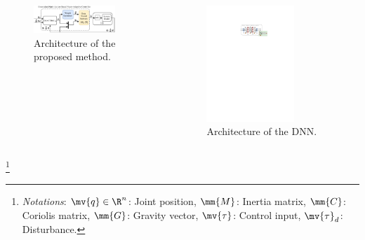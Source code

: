\documentclass[8pt, aspectratio=169, handout]{beamer}
\begin{document}
\begin{frame}{\insertsubsectionhead}
\begin{columns}

      \begin{figure}
        \includegraphics[width=0.8\textwidth]{figures/Controller.drawio.pdf}
        \caption{Architecture of the proposed method.}
      \end{figure}

    {
      \begin{figure}
        \includegraphics[width=0.7\textwidth]{figures/DNN.drawio.pdf}
        \caption{Architecture of the DNN.}
      \end{figure}
    }

  \end{columns}

    \let\thefootnote\relax\footnote{
      \textit{Notations}: 
        $\mv{q}\in\R^n$: Joint position, $\mm{M}$: Inertia matrix, $\mm{C}$: Coriolis matrix, $\mm{G}$: Gravity vector, $\mv{\tau}$: Control input, $\mv{\tau}_d$: Disturbance.
      }

\end{frame}
\end{document}
